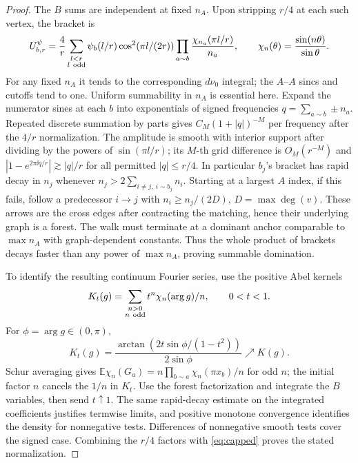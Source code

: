\begin{proof}
The \(B\) sums are independent at fixed \(n_A\). Upon stripping \(r/4\) at each such vertex, the bracket is
\[
 U_{b,r}^{\psi}=\frac4r\sum_{\substack{l<r\\ l\ {\rm odd}}}
 \psi_b(l/r)\cos^2(\pi l/(2r))
 \prod_{a\sim b}\frac{\chi_{n_a}(\pi l/r)}{n_a},
 \qquad \chi_n(\theta)=\frac{\sin(n\theta)}{\sin\theta}.
\]
For any fixed \(n_A\) it tends to the corresponding \(d\nu_0\) integral; the \(A\)--\(A\) sincs and cutoffs tend to one. Uniform summability in \(n_A\) is essential here. Expand the numerator sines at each \(b\) into exponentials of signed frequencies \(q=\sum_{a\sim b}\pm n_a\). Repeated discrete summation by parts gives \(C_M(1+|q|)^{-M}\) per frequency after the \(4/r\) normalization. The amplitude is smooth with interior support after dividing by the powers of \(\sin(\pi l/r)\); its \(M\)-th grid difference is \(O_M(r^{-M})\) and \(|1-e^{2\pi\ii q/r}|\gtrsim |q|/r\) for all permitted \(|q|\le r/4\). In particular \(b_j\)'s bracket has rapid decay in \(n_j\) whenever \(n_j>2\sum_{i\ne j,\ i\sim b_j}n_i\). Starting at a largest \(A\) index, if this fails, follow a predecessor \(i\to j\) with \(n_i\ge n_j/(2D)\), \(D=\max\deg(v)\). These arrows are the cross edges after contracting the matching, hence their underlying graph is a forest. The walk must terminate at a dominant anchor comparable to \(\max n_A\) with graph-dependent constants. Thus the whole product of brackets decays faster than any power of \(\max n_A\), proving summable domination.

To identify the resulting continuum Fourier series, use the positive Abel kernels
\[
 K_t(g)=\sum_{\substack{n>0\\n\ {\rm odd}}}t^n\chi_n(\arg g)/n,\qquad 0<t<1.
\]
For \(\phi=\arg g\in(0,\pi)\),
\[
 K_t(g)=\frac{\arctan(2t\sin\phi/(1-t^2))}{2\sin\phi}
 \nearrow K(g).
\]
Schur averaging gives \(\mathbb E\chi_n(G_a)=n\prod_{b\sim a}\chi_n(\pi x_b)/n\) for odd \(n\); the initial factor \(n\) cancels the \(1/n\) in \(K_t\). Use the forest factorization and integrate the \(B\) variables, then send \(t\uparrow1\). The same rapid-decay estimate on the integrated coefficients justifies termwise limits, and positive monotone convergence identifies the density for nonnegative tests. Differences of nonnegative smooth tests cover the signed case. Combining the \(r/4\) factors with \eqref{eq:capped} proves the stated normalization.
\end{proof}
